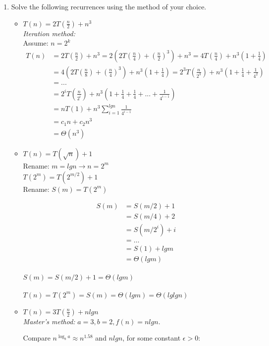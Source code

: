 \documentclass[[11pts]{report}
\begin{document}
\begin{enumerate}
\item Solve the following recurrences using the method of your choice.

\begin{itemize}

\item $T(n) = 2T(\frac{n}{2}) + n^3$
\\ \textit{Iteration method:}
\\ Assume: $n = 2^k$
\begin{align*}
T(n) &= 2T(\frac{n}{2}) + n^3 = 2(2T(\frac{n}{4}) + (\frac{n}{2})^3) + n^3 = 4T(\frac{n}{4}) + n^3(1 + \frac{1}{4}) \\ &= 4(2T(\frac{n}{8}) + (\frac{n}{4})^3) + n^3(1 + \frac{1}{4}) = 2^3T(\frac{n}{2^3}) + n^3(1 + \frac{1}{4} + \frac{1}{4^2}) \\ &= ... \\ &= 2^iT(\frac{n}{2^i}) + n^3(1 + \frac{1}{4} + \frac{1}{4} +  ... + \frac{1}{4^{i-1}}) \\ &= nT(1) + n^3 \sum_{i=1}^{lgn}{\frac{1}{4^{i-1}}} \\ &= c_1n + c_2n^3  \\ &= \Theta(n^3)
\end{align*}

\item $T(n) = T(\sqrt{n}) + 1$
\\ Rename: $m = lgn \to n = 2^m$
\\ $T(2^m) = T(2^{m/2}) + 1$
\\ Rename: $S(m) = T(2^m)$

\begin{align*}
S(m) &= S(m/2) + 1 \\
	 &= S(m/4) + 2 \\
	 &= S(m/2^i) + i \\
	 &= \hdots \\
	 &= S(1) + lgm \\
	 &= \Theta(lgm)
\end{align*}
\\ $S(m) = S(m/2) + 1 = \Theta(lgm)$
\\ 
\\ $T(n) = T(2^m) = S(m) = \Theta(lgm) = \Theta(lglgn)$

\item $T(n) = 3T(\frac{n}{2}) + nlgn$
\\ \textit{Master's method:}
$a = 3, b = 2, f(n) = nlgn$.
\par Compare $n^{\log_b a} \approx n^{1.58}$ and $nlgn$, for some constant $\epsilon > 0$:


\end{itemize}
\end{enumerate}
\end{document}

